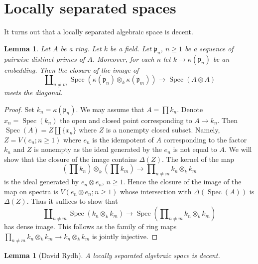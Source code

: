 \documentclass{stacks-project}
\theoremstyle{plain}
\newtheorem{lemma}[subsection]{Lemma}
\theoremstyle{definition}
\theoremstyle{remark}
\numberwithin{equation}{subsection}
\def\Spec{\mathop{\mathrm{Spec}}}
\begin{document}
\section{Locally separated spaces}
\label{section-locally-separated}

\noindent
It turns out that a locally separated algebraic space is decent.

\begin{lemma}
\label{lemma-infinite-number}
Let $A$ be a ring. Let $k$ be a field. Let $\mathfrak p_n$, $n \geq 1$
be a sequence of pairwise distinct primes of $A$. Moreover, for each
$n$ let $k \to \kappa(\mathfrak p_n)$ be an embedding. Then the closure
of the image of
$$
\coprod\nolimits_{n \not = m}
\Spec(\kappa(\mathfrak p_n) \otimes_k \kappa(\mathfrak p_m))
\longrightarrow
\Spec(A \otimes A)
$$
meets the diagonal.
\end{lemma}

\begin{proof}
Set $k_n = \kappa(\mathfrak p_n)$. We may assume that $A = \prod k_n$.
Denote $x_n = \Spec(k_n)$ the open and closed point corresponding to
$A \to k_n$. Then $\Spec(A) = Z \amalg \{x_n\}$ where $Z$ is a nonempty
closed subset. Namely, $Z = V(e_n; n \geq 1)$ where $e_n$
is the idempotent of $A$ corresponding to the factor $k_n$
and $Z$ is nonempty as the ideal generated by the $e_n$ is not
equal to $A$. We will show that the closure of the image
contains $\Delta(Z)$. The kernel of the map
$$
(\prod k_n) \otimes_k (\prod k_m)
\longrightarrow
\prod\nolimits_{n \not = m} k_n \otimes_k k_m
$$
is the ideal generated by $e_n \otimes e_n$, $n \geq 1$.
Hence the closure of the image of the map on spectra is 
$V(e_n \otimes e_n; n \geq 1)$ whose intersection with $\Delta(\Spec(A))$
is $\Delta(Z)$. Thus it suffices to show that
$$
\coprod\nolimits_{n \not = m} \Spec(k_n \otimes_k k_m)
\longrightarrow
\Spec(\prod\nolimits_{n \not = m} k_n \otimes_k k_m)
$$
has dense image. This follows as the family of ring maps
$\prod_{n \not = m} k_n \otimes_k k_m \to k_n \otimes_k k_m$
is jointly injective.
\end{proof}

\begin{lemma}[David Rydh]
\label{lemma-locally-separated-decent}
A locally separated algebraic space is decent.
\end{lemma}
\end{document}
